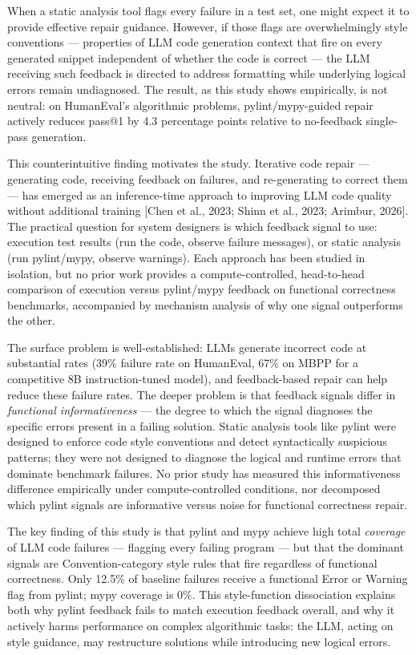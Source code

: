 
When a static analysis tool flags every failure in a test set, one might expect it to provide effective repair guidance. However, if those flags are overwhelmingly style conventions --- properties of LLM code generation context that fire on every generated snippet independent of whether the code is correct --- the LLM receiving such feedback is directed to address formatting while underlying logical errors remain undiagnosed. The result, as this study shows empirically, is not neutral: on HumanEval's algorithmic problems, pylint/mypy-guided repair actively reduces pass@1 by 4.3 percentage points relative to no-feedback single-pass generation.

This counterintuitive finding motivates the study. Iterative code repair --- generating code, receiving feedback on failures, and re-generating to correct them --- has emerged as an inference-time approach to improving LLM code quality without additional training [Chen et al., 2023; Shinn et al., 2023; Arimbur, 2026]. The practical question for system designers is which feedback signal to use: execution test results (run the code, observe failure messages), or static analysis (run pylint/mypy, observe warnings). Each approach has been studied in isolation, but no prior work provides a compute-controlled, head-to-head comparison of execution versus pylint/mypy feedback on functional correctness benchmarks, accompanied by mechanism analysis of why one signal outperforms the other.

The surface problem is well-established: LLMs generate incorrect code at substantial rates (39\% failure rate on HumanEval, 67\% on MBPP for a competitive 8B instruction-tuned model), and feedback-based repair can help reduce these failure rates. The deeper problem is that feedback signals differ in \textit{functional informativeness} --- the degree to which the signal diagnoses the specific errors present in a failing solution. Static analysis tools like pylint were designed to enforce code style conventions and detect syntactically suspicious patterns; they were not designed to diagnose the logical and runtime errors that dominate benchmark failures. No prior study has measured this informativeness difference empirically under compute-controlled conditions, nor decomposed which pylint signals are informative versus noise for functional correctness repair.

The key finding of this study is that pylint and mypy achieve high total \textit{coverage} of LLM code failures --- flagging every failing program --- but that the dominant signals are Convention-category style rules that fire regardless of functional correctness. Only 12.5\% of baseline failures receive a functional Error or Warning flag from pylint; mypy coverage is 0\%. This style-function dissociation explains both why pylint feedback fails to match execution feedback overall, and why it actively harms performance on complex algorithmic tasks: the LLM, acting on style guidance, may restructure solutions while introducing new logical errors.

